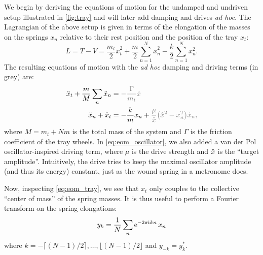 \documentclass[10pt,aps,pra,twocolumn,nofootinbib,superscriptaddress,floatfix]{revtex4-2}
\let\orghat\hat
\def\hat#1{\orghat{\kern0pt #1}}
\begin{document}
We begin by deriving the equations of motion for the undamped and undriven setup illustrated in \cref{fig:tray} and will later add damping and drives \emph{ad hoc}. The Lagrangian of the above setup is given in terms of the elongation of the masses on the springs \(x_{n}\) relative to their rest position and the position of the tray \(x_{t}\):
\begin{equation}
  \label{eq:lagrangian}
  L = T-V = \frac{m_{t}}{2} \dot{x}^{2}_{t}
  + \frac{m}{2}\sum_{n=1}^{N} \dot{x}^{2}_{n} - \frac{k}{2}\sum_{n=1}^{N} x_{n}^{2}.
\end{equation}
The resulting equations of motion with the \emph{ad hoc} damping and driving terms (in grey) are:
\begin{align}
  \label{eq:eom_tray}
  \ddot{x}_{t} + \frac{m}{M} \sum_{n}\ddot{x}_{n}&=  \color{gray}{- \frac{\Gamma}{m_{t}} \dot{x}}\\
  \label{eq:eom_oscillator}\ddot{x}_{n}+\ddot{x}_{t} &= -\frac{k}{m} x_{n} +\color{gray}{\frac{\mu}{\hat{x}} \pqty{\hat{x}^{2}-x_{n}^{2}}\dot{x}_{n}},
\end{align}
where \(M= m_{t}+N m\) is the total mass of the system and \(\Gamma\) is the friction coefficient of the tray wheels.
In \cref{eq:eom_oscillator}, we also added a van der Pol oscillator-inspired driving term, where \(\mu\) is the drive strength and \(\hat{x}\) is the ``target amplitude''. Intuitively, the drive tries to keep the maximal oscillator amplitude (and thus its energy) constant, just as the wound spring in a metronome does.

Now, inspecting \cref{eq:eom_tray}, we see that \(x_{t}\) only couples to the collective ``center of mass'' of the spring masses. It is thus useful to perform a Fourier transform on the spring elongations:
\begin{equation}
  \label{eq:fourier_def}
  y_{k} = \frac{1}{N}\sum_{n} \eu^{-2\pi\iu k n}x_{n}
\end{equation}
where \(k=-\lceil (N-1) / 2\rceil,\ldots,\lfloor(N-1) / 2\rfloor\) and \(y_{-k}=y^{*}_{k}\).
\end{document}
